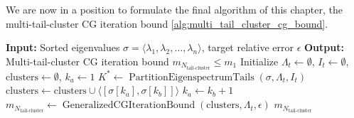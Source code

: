 We are now in a position to formulate the final algorithm of this chapter, the multi-tail-cluster CG iteration bound \cref{alg:multi_tail_cluster_cg_bound}.
\begin{algorithm}[H]
    \caption{$\operatorname{MultiTailClusterCGIterationBound}(\sigma, \epsilon)$}
    \begin{algorithmic}[1]
        \State \textbf{Input:} Sorted eigenvalues $\sigma = \langle\lambda_1, \lambda_2, \ldots, \lambda_n\rangle$, target relative error $\epsilon$
        \State \textbf{Output:} Multi-tail-cluster CG iteration bound $m_{N_{\text{tail-cluster}}} \leq m_1$
        \State Initialize $\Lambda_t \gets \emptyset$, $I_t\gets\emptyset$, $\text{clusters} \gets \emptyset$, $k_a\gets 1$
        \State $K^* \gets \operatorname{PartitionEigenspectrumTails}(\sigma, \Lambda_t, I_t)$
         
            \State $\text{clusters} \gets \text{clusters} \cup \langle[\sigma[k_a], \sigma[k_b]]\rangle$
        \EndIf
        \State $k_a \gets k_b + 1$
        \EndFor
        \State $m_{N_{\text{tail-cluster}}} \gets \operatorname{GeneralizedCGIterationBound}(\text{clusters}, \Lambda_t, \epsilon)$
        \State \Return $m_{N_{\text{tail-cluster}}}$
    \end{algorithmic}
    \label{alg:multi_tail_cluster_cg_bound}
\end{algorithm}
